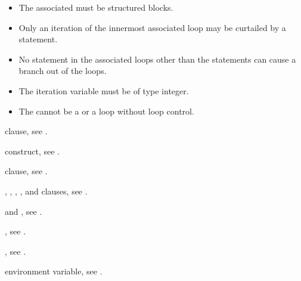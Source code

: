 \begin{fortranspecific}
\begin{itemize}
\item The associated  must be structured blocks.
\item Only an iteration of the innermost associated loop may be curtailed 
      by a  statement.
\item No statement in the associated loops other than the  statements 
      can cause a branch out of the loops.
\item The  iteration variable must be of type integer.
\item The  cannot be a  or a  loop 
      without loop control.
\end{itemize}
\end{fortranspecific}

\begin{crossrefs}
\item {} clause, see .

\item {} construct, see
.

\item {} clause, see
.

\item {}, , , , 
and  clauses, see .

\item {} and , see
  .

\item {}, see .

\item {}, see
.

\item {} environment variable, see
.
\end{crossrefs}




